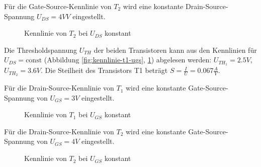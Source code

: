 \documentclass[a4paper]{article}
\newcommand{\ugs}{U_{GS}}
\newcommand{\uds}{U_{DS}}
\newcommand{\uth}{U_{TH}}
\begin{document}
Für die Gate-Source-Kennlinie von $T_2$ wird eine konstante Drain-Source-Spannung $\uds=4\si{V}V$ eingestellt.
\begin{figure}[H]
    \centering
    \caption{Kennlinie von $T_2$ bei $\uds$ konstant}
    \label{fig:kennlinie-t2-ugs}
\end{figure}



Die Thresholdspannung $\uth$ der beiden Transistoren kann aus den Kennlinien für $\uds = \text{const}$ (Abbildung \ref{fig:kennlinie-t1-ugs}, \ref{fig:kennlinie-t2-ugs}) abgelesen werden: $\uth_1=2.5\si{V}$, $\uth_2=3.6\si{V}$. Die Steilheit des Transistors T1 beträgt $S=\frac{I}{U}= 0.067\frac{A}{V}$.

Für die Drain-Source-Kennlinie von $T_1$ wird eine konstante Gate-Source-Spannung von $\ugs=3\si{V}$ eingestellt.
\begin{figure}[H]
    \centering
    \caption{Kennlinie von $T_1$ bei $\ugs$ konstant}
    \label{fig:kennlinie-t1-uds}
\end{figure}
Für die Drain-Source-Kennlinie von $T_2$ wird eine konstante Gate-Source-Spannung von $\ugs=4\si{V}$ eingestellt.
\begin{figure}[H]
    \centering
    \caption{Kennlinie von $T_2$ bei $\ugs$ konstant}
    \label{fig:kennlinie-t2-uds}
\end{figure}
\end{document}
